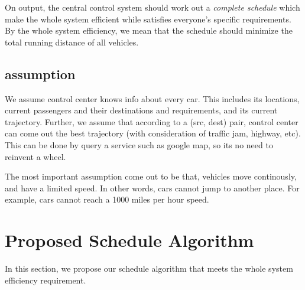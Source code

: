 \documentclass{vldb}
\begin{document}
On output, the central control system should work out a \textit{complete schedule}
which make the whole system efficient while satisfies everyone's specific requirements.
By the whole system efficiency,
we mean that the schedule should minimize the total running distance of all vehicles.

\subsection{assumption}
We assume control center knows info about every car.
This includes its locations,
current passengers and their destinations and requirements,
and its current trajectory.
Further, we assume that according to a (src, dest) pair,
control center can come out the best trajectory (with consideration of traffic jam, highway, etc).
This can be done by query a service such as google map, so its no need to reinvent a wheel.

The most important assumption come out to be that,
vehicles move continously, and have a limited speed.
In other words, cars cannot jump to another place.
For example, cars cannot reach a 1000 miles per hour speed.

\section{Proposed Schedule Algorithm}
\label{schedule}

In this section, we propose our schedule algorithm that meets the whole system efficiency requirement.

\end{document}
